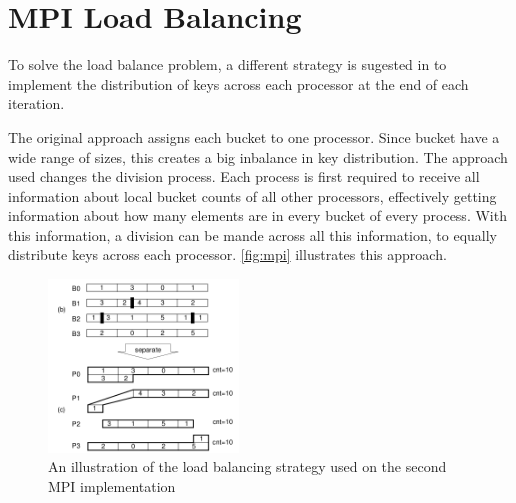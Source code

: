 \section{MPI Load Balancing}
\label{sec:mpi_bal}

To solve the load balance problem, a different strategy is sugested in \cite{paper} to implement the distribution of keys across each processor at the end of each iteration.

The original approach assigns each bucket to one processor. Since bucket have a wide range of sizes, this creates a big inbalance in key distribution. The approach used changes the division process. Each process is first required to receive all information about local bucket counts of all other processors, effectively getting information about how many elements are in every bucket of every process. With this information, a division can be mande across all this information, to equally distribute keys across each processor. \autoref{fig:mpi} illustrates this approach.

\begin{figure}[!htpb]
	\begin{center}
		\includegraphics[width=0.45\textwidth]{images/mpi_bal}
	\end{center}
	\caption{An illustration of the load balancing strategy used on the second MPI implementation}
	\label{fig:mpi}
\end{figure}


